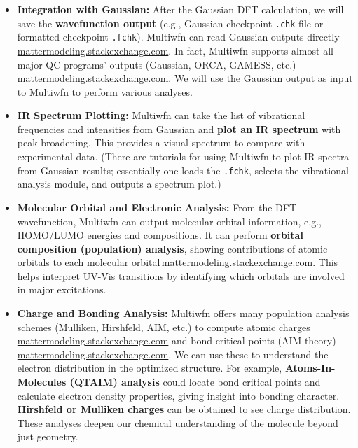 \documentclass[11pt]{article}
\begin{document}
\begin{itemize}
  \item \textbf{Integration with Gaussian:} After the Gaussian DFT calculation, we will save the \textbf{wavefunction output} (e.g., Gaussian checkpoint \texttt{.chk} file or formatted checkpoint \texttt{.fchk}). Multiwfn can read Gaussian outputs directly\,\href{https://mattermodeling.stackexchange.com/questions/3493/quantifying-electronic-overlap\#:\~:text=,MRCC\%2C\%20deMon2k\%2C\%20Firefly\%2C\%20CFour\%2C\%20Turbomole}{mattermodeling.stackexchange.com}. In fact, Multiwfn supports almost all major QC programs’ outputs (Gaussian, ORCA, GAMESS, etc.)\,\href{https://mattermodeling.stackexchange.com/questions/3493/quantifying-electronic-overlap\#:\~:text=,MRCC\%2C\%20deMon2k\%2C\%20Firefly\%2C\%20CFour\%2C\%20Turbomole}{mattermodeling.stackexchange.com}. We will use the Gaussian output as input to Multiwfn to perform various analyses.
  \item \textbf{IR Spectrum Plotting:} Multiwfn can take the list of vibrational frequencies and intensities from Gaussian and \textbf{plot an IR spectrum} with peak broadening. This provides a visual spectrum to compare with experimental data. (There are tutorials for using Multiwfn to plot IR spectra from Gaussian results; essentially one loads the \texttt{.fchk}, selects the vibrational analysis module, and outputs a spectrum plot.)
  \item \textbf{Molecular Orbital and Electronic Analysis:} From the DFT wavefunction, Multiwfn can output molecular orbital information, e.g., HOMO/LUMO energies and compositions. It can perform \textbf{orbital composition (population) analysis}, showing contributions of atomic orbitals to each molecular orbital\,\href{https://mattermodeling.stackexchange.com/questions/3493/quantifying-electronic-overlap\#:\~:text=(Gasteiger)\%20are\%20supported,be\%20very\%20flexibly\%20and\%20conveniently}{mattermodeling.stackexchange.com}. This helps interpret UV-Vis transitions by identifying which orbitals are involved in major excitations.
  \item \textbf{Charge and Bonding Analysis:} Multiwfn offers many population analysis schemes (Mulliken, Hirshfeld, AIM, etc.) to compute atomic charges\,\href{https://mattermodeling.stackexchange.com/questions/3493/quantifying-electronic-overlap\#:\~:text=orbital\%20contributions.\%20,Stout\%20\%26\%20Politzer\%2C\%20SCPA\%2C\%20Hirshfeld}{mattermodeling.stackexchange.com} and bond critical points (AIM theory)\,\href{https://mattermodeling.stackexchange.com/questions/3493/quantifying-electronic-overlap\#:\~:text=Some\%20of\%20the\%20analysis\%20it,is\%20able\%20to\%20do}{mattermodeling.stackexchange.com}. We can use these to understand the electron distribution in the optimized structure. For example, \textbf{Atoms-In-Molecules (QTAIM) analysis} could locate bond critical points and calculate electron density properties, giving insight into bonding character. \textbf{Hirshfeld or Mulliken charges} can be obtained to see charge distribution. These analyses deepen our chemical understanding of the molecule beyond just geometry.

\end{itemize}
\end{document}
